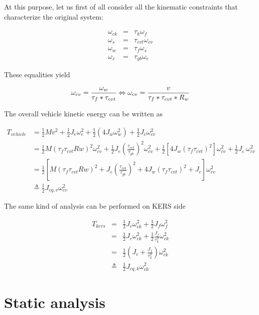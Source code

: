 \documentclass[11pt]{article}
\begin{document}
At this purpose, let us first of all consider all the kinematic constraints that characterize the original system:

\begin{eqnarray}
	\omega_{ck}&=&\tau_k \omega_f\\
	\omega_s &=&\tau_{cvt} \omega_{cv}\\
	\omega_w &=&\tau_f \omega_s\\
	\omega_s &=&\tau_{gb} \omega_e
\end{eqnarray}

These equalities yield

\begin{equation}
\omega_{cv}=\frac{\omega_w}{\tau_f*\tau_{cvt}} \Leftrightarrow \omega_{cv}=\frac{v}{\tau_f*\tau_{cvt}*R_w}\\
\end{equation}
\vspace{1mm}

The overall vehicle kinetic energy can be written as

\begin{align}
T_{vehicle}&=\frac{1}{2}Mv^2+\frac{1}{2}J_e\omega_e^2+ \frac{1}{2}(4J_w\omega_w^2)+\frac{1}{2}J_c\omega_{cv}^2 \\
	 &=\frac{1}{2}M(\tau_f\tau_{cvt}Rw)^2\omega_{cv}^2+\frac{1}{2}J_e\left(\frac{\tau_{cvt}}{\tau_{gb}}\right)^2\omega_{cv}^2+\frac{1}{2}\left[4J_w\left(\tau_f \tau_{cvt}\right)^2\right]\omega_{cv}^2+\frac{1}{2}J_c\ \omega_{cv}^2\\
	 &=\frac{1}{2}\left[M(\tau_f\tau_{cvt}Rw)^2+J_e\left(\frac{\tau_{cvt}}{\tau_{gb}}\right)^2+4J_w\left(\tau_f \tau_{cvt}\right)^2+J_c\right] \omega_{cv}^2\\
	 & \triangleq \frac{1}{2}J_{eq,v}\omega_{cv}^2 
\end{align}
\vspace{1mm}

The same kind of analysis can be performed on KERS side

\begin{eqnarray}
	T_{kers}&=&\frac{1}{2}J_c\omega_{ck}^2+\frac{1}{2}J_f\omega_f^2\\
	&=&\frac{1}{2}J_c\omega_{ck}^2+\frac{1}{2}\frac{J_f}{\tau_k^2}\omega_{ck}^2\\
	&=&\frac{1}{2}\left(J_c+\frac{J_f}{\tau_k^2}\right)\omega_{ck}^2\\
	&\triangleq & \frac{1}{2}J_{eq,k}\omega_{ck}^2
\end{eqnarray}

\section{Static analysis}
\end{document}
